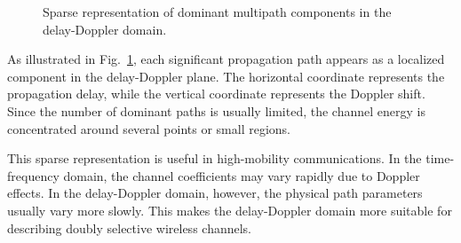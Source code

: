 \begin{figure}[H]
\centering
{}
\caption{Sparse representation of dominant multipath components in the delay-Doppler domain.}
\label{fig:delay_doppler_channel}

\end{figure}

As illustrated in Fig.~\ref{fig:delay_doppler_channel}, each significant propagation path appears as a localized component in the delay-Doppler plane. The horizontal coordinate represents the propagation delay, while the vertical coordinate represents the Doppler shift. Since the number of dominant paths is usually limited, the channel energy is concentrated around several points or small regions.

This sparse representation is useful in high-mobility communications. In the time-frequency domain, the channel coefficients may vary rapidly due to Doppler effects. In the delay-Doppler domain, however, the physical path parameters usually vary more slowly. This makes the delay-Doppler domain more suitable for describing doubly selective wireless channels.

